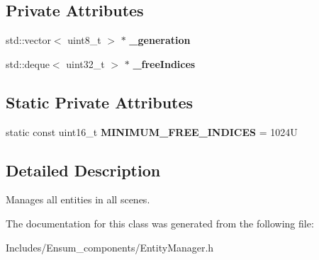\subsection*{Private Attributes}
\begin{DoxyCompactItemize}
\item 
std\+::vector$<$ uint8\+\_\+t $>$ $\ast$ {\bfseries \+\_\+generation}\hypertarget{class_ensum_1_1_components_1_1_entity_manager_a4eb470bc60cab8633f8a9811cb9a139f}{}\label{class_ensum_1_1_components_1_1_entity_manager_a4eb470bc60cab8633f8a9811cb9a139f}

\item 
std\+::deque$<$ uint32\+\_\+t $>$ $\ast$ {\bfseries \+\_\+free\+Indices}\hypertarget{class_ensum_1_1_components_1_1_entity_manager_aa90213c24c2e4f8f8c09f9cf1c21a613}{}\label{class_ensum_1_1_components_1_1_entity_manager_aa90213c24c2e4f8f8c09f9cf1c21a613}

\end{DoxyCompactItemize}
\subsection*{Static Private Attributes}
\begin{DoxyCompactItemize}
\item 
static const uint16\+\_\+t {\bfseries M\+I\+N\+I\+M\+U\+M\+\_\+\+F\+R\+E\+E\+\_\+\+I\+N\+D\+I\+C\+ES} = 1024U\hypertarget{class_ensum_1_1_components_1_1_entity_manager_a6d7bbd2c0c226a051f49382015c24962}{}\label{class_ensum_1_1_components_1_1_entity_manager_a6d7bbd2c0c226a051f49382015c24962}

\end{DoxyCompactItemize}


\subsection{Detailed Description}
Manages all entities in all scenes. 

The documentation for this class was generated from the following file\+:\begin{DoxyCompactItemize}
\item 
Includes/\+Ensum\+\_\+components/Entity\+Manager.\+h\end{DoxyCompactItemize}
